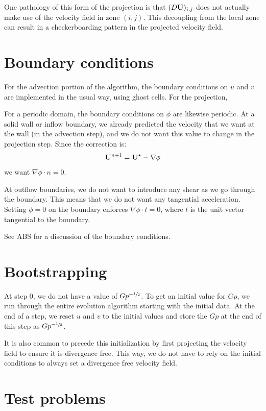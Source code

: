 One pathology of this form of the projection is that $(D{\bf U})_{i,j}$ does
not actually make use of the velocity field in zone $(i,j)$.  This
decoupling from the local zone can result in a checkerboarding pattern
in the projected velocity field.

\section{Boundary conditions}

For the advection portion of the algorithm, the boundary conditions
on $u$ and $v$ are implemented in the usual way, using ghost cells.
For the projection, 

For a periodic domain, the boundary conditions on $\phi$ are likewise
periodic.  At a solid wall or inflow boundary, we already predicted
the velocity that we want at the wall (in the advection step), and we
do not want this value to change in the projection step.  Since the
correction is:
\begin{equation}
{\bf U}^{n+1} = {\bf U}^\star - \nabla \phi
\end{equation}
we want $\nabla \phi \cdot n = 0$.  

At outflow boundaries, we do not want to introduce any shear as we go
through the boundary.  This means that we do not want any tangential
acceleration.  Setting $\phi = 0$ on the boundary enforces $\nabla
\phi \cdot t = 0$, where $t$ is the unit vector tangential to the
boundary.

See ABS for a discussion of the boundary conditions.

\section{Bootstrapping}

At step 0, we do not have a value of $Gp^{-{\sfrac{1}{2}}}$.  To get an initial value
for $Gp$, we run through the entire evolution algorithm starting with the
initial data.  At the end of a step, we reset $u$ and $v$ to the initial
values and store the $Gp$ at the end of this step as $Gp^{-{\sfrac{1}{2}}}$.

It is also common to precede this initialization by first projecting
the velocity field to ensure it is divergence free.  This way, we do
not have to rely on the initial conditions to always set a divergence
free velocity field.


\section{Test problems}

